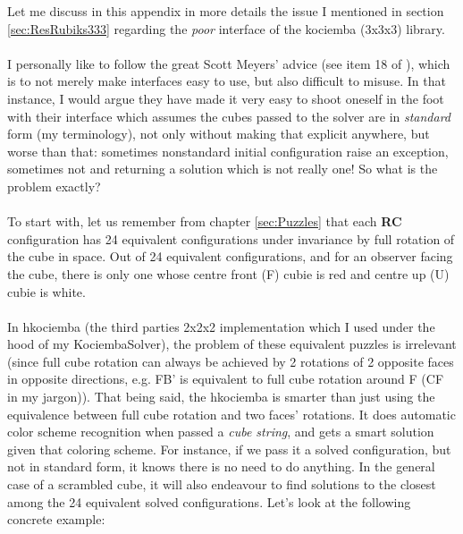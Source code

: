 

\label{sec:Kociemba} %


Let me discuss in this appendix in more details the issue I mentioned in section \ref{sec:ResRubiks333} regarding the \textit{poor} interface of the kociemba (3x3x3) library.
\\
\\
I personally like to follow the great Scott Meyers' advice (see item 18 of \cite{meyers2005effective}), which is to not merely make interfaces easy to use, but also difficult to misuse. In that instance, I would argue they have made it very easy to shoot oneself in the foot with their interface which assumes the cubes passed to the solver are in \textit{standard} form (my terminology), not only without making that explicit anywhere, but worse than that: sometimes nonstandard initial configuration raise an exception, sometimes not and returning a solution which is not really one! So what is the problem exactly?
\\
\\
To start with, let us remember from chapter \ref{sec:Puzzles} that each \textbf{RC} configuration has 24 equivalent configurations under invariance by full rotation of the cube in space. Out of 24 equivalent configurations, and for an observer facing the cube, there is only one whose centre front (F) cubie is red and centre up (U) cubie is white.
\\
\\
In hkociemba (the third parties 2x2x2 implementation which I used under the hood of my KociembaSolver), the problem of these equivalent puzzles is irrelevant (since full cube rotation can always be achieved by 2 rotations of 2 opposite faces in opposite directions, e.g. FB' is equivalent to full cube rotation around F (CF in my jargon)). That being said, the hkociemba is smarter than just using the equivalence between full cube rotation and two faces' rotations. It does automatic color scheme recognition when passed a \textit{cube string}, and gets a smart solution given that coloring scheme. For instance, if we pass it a solved configuration, but not in standard form, it knows there is no need to do anything. In the general case of a scrambled cube, it will also endeavour to find solutions to the closest among the 24 equivalent solved configurations. Let's look at the following concrete example:


